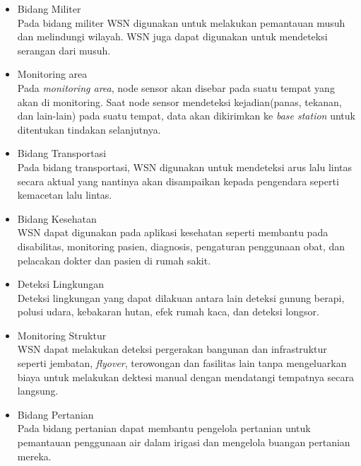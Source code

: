 \documentclass[a4paper,twoside]{article}
\begin{document}
\begin{enumerate}
\begin{itemize}
\item Bidang Militer\\
Pada bidang militer WSN digunakan untuk melakukan pemantauan musuh dan melindungi wilayah. WSN juga dapat digunakan untuk mendeteksi serangan dari musuh.

\item Monitoring area\\
Pada \textit{monitoring area}, node sensor akan disebar pada suatu tempat yang akan di monitoring. Saat node sensor mendeteksi kejadian(panas, tekanan, dan lain-lain) pada suatu tempat, data akan dikirimkan ke \textit{base station} untuk ditentukan tindakan selanjutnya.

\item Bidang Transportasi\\
Pada bidang transportasi, WSN digunakan untuk mendeteksi arus lalu lintas secara aktual yang nantinya akan disampaikan kepada pengendara seperti kemacetan lalu lintas. 

\item Bidang Kesehatan\\
WSN dapat digunakan pada aplikasi kesehatan seperti membantu pada disabilitas, monitoring pasien, diagnosis, pengaturan penggunaan obat, dan pelacakan dokter dan pasien di rumah sakit.

\item Deteksi Lingkungan\\
Deteksi lingkungan yang dapat dilakuan antara lain deteksi gunung berapi, polusi udara, kebakaran hutan, efek rumah kaca, dan deteksi longsor.

\item Monitoring Struktur\\
WSN dapat melakukan deteksi pergerakan bangunan dan infrastruktur seperti jembatan, \textit{flyover}, terowongan dan fasilitas lain tanpa mengeluarkan biaya untuk melakukan dektesi manual dengan mendatangi tempatnya secara langsung.

\item Bidang Pertanian\\
Pada bidang pertanian dapat membantu pengelola pertanian untuk pemantauan penggunaan air dalam irigasi dan mengelola buangan pertanian mereka.
\end{itemize}


\end{enumerate}
\end{document}
